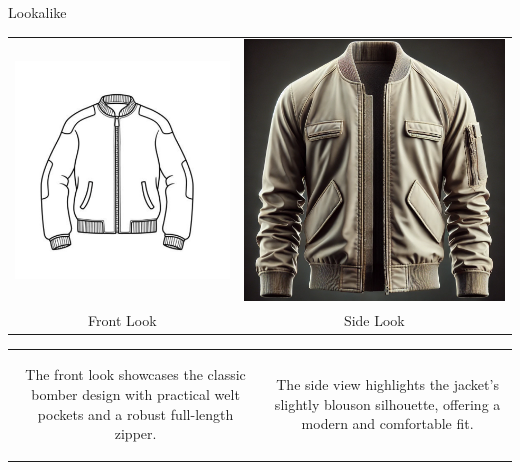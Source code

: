 \documentclass[11pt,a4paper]{article}
\newcommand{\techsection}[1]{
  \vspace{0.8cm}
  \begin{tcolorbox}[
    enhanced,
    colback=accentblue!80,
    colframe=accentblue,
    coltext=white,
    round corners,
    boxrule=0pt,
    width=\textwidth,
    halign=left,
    fontupper=\large\bfseries,
    top=0.4cm,
    bottom=0.4cm,
    left=0.2cm,
    right=0.2cm
  ]
    #1
  \end{tcolorbox}
  \vspace{0.3cm}
}
\begin{document}

\newpage
\techsection{Lookalike}
\begin{table}[H]
  \centering
  \begin{tabular}{cc}
    \includegraphics[width=0.45\linewidth]{Screenshot_2025-03-09_at_22.37.32.png} & \includegraphics[width=0.45\linewidth]{DALLE_2025-03-09_22.47.57_-_A_realistic_bomber_jacket_in_a_neutral_color_shown_from_the_front_view._The_jacket_has_a_ribbed_collar_1.5_inches_tall_full-length_zipper_22_inch.webp} \\
    \small Front Look & \small Side Look \\
  \end{tabular}
\end{table}

\vspace{1cm}
\begin{table}[H]
  \centering
  \begin{tabular}{cc}
    \begin{tcolorbox}[colback=white, colframe=accentblue, width=0.45\linewidth, title=Description, height=10cm]
      The front look showcases the classic bomber design with practical welt pockets and a robust full-length zipper.
    \end{tcolorbox}
    &
    \begin{tcolorbox}[colback=white, colframe=accentblue, width=0.45\linewidth, title=Description, height=10cm]
      The side view highlights the jacket's slightly blouson silhouette, offering a modern and comfortable fit.
    \end{tcolorbox}
  \end{tabular}
\end{table}
\end{document}
